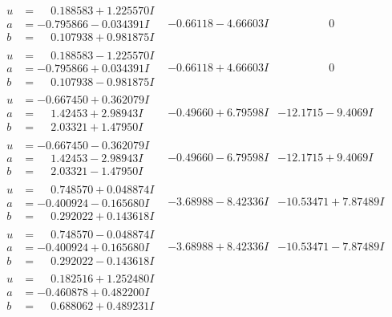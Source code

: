\documentclass[1p]{elsarticle_modified}
\theoremstyle{definition}
\begin{document}
$$\begin{array}{c|c|c}
\begin{aligned}
u &= \phantom{-}0.188583 + 1.225570 I \\
a &= -0.795866 - 0.034391 I \\
b &= \phantom{-}0.107938 + 0.981875 I\end{aligned}
 & -0.66118 - 4.66603 I & \phantom{-0.000000 } 0 \\ \hline\begin{aligned}
u &= \phantom{-}0.188583 - 1.225570 I \\
a &= -0.795866 + 0.034391 I \\
b &= \phantom{-}0.107938 - 0.981875 I\end{aligned}
 & -0.66118 + 4.66603 I & \phantom{-0.000000 } 0 \\ \hline\begin{aligned}
u &= -0.667450 + 0.362079 I \\
a &= \phantom{-}1.42453 + 2.98943 I \\
b &= \phantom{-}2.03321 + 1.47950 I\end{aligned}
 & -0.49660 + 6.79598 I & -12.1715 - 9.4069 I \\ \hline\begin{aligned}
u &= -0.667450 - 0.362079 I \\
a &= \phantom{-}1.42453 - 2.98943 I \\
b &= \phantom{-}2.03321 - 1.47950 I\end{aligned}
 & -0.49660 - 6.79598 I & -12.1715 + 9.4069 I \\ \hline\begin{aligned}
u &= \phantom{-}0.748570 + 0.048874 I \\
a &= -0.400924 - 0.165680 I \\
b &= \phantom{-}0.292022 + 0.143618 I\end{aligned}
 & -3.68988 - 8.42336 I & -10.53471 + 7.87489 I \\ \hline\begin{aligned}
u &= \phantom{-}0.748570 - 0.048874 I \\
a &= -0.400924 + 0.165680 I \\
b &= \phantom{-}0.292022 - 0.143618 I\end{aligned}
 & -3.68988 + 8.42336 I & -10.53471 - 7.87489 I \\ \hline\begin{aligned}
u &= \phantom{-}0.182516 + 1.252480 I \\
a &= -0.460878 + 0.482200 I \\
b &= \phantom{-}0.688062 + 0.489231 I\end{aligned}

\end{array}$$
\end{document}

